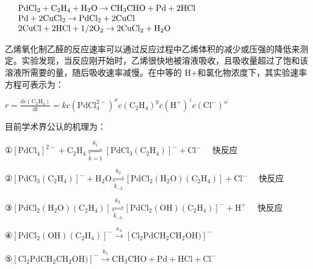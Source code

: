$
\begin{array}{r l}&\mathrm {PdCl_ {2}} + \mathrm {C_ {2} H_ {4}} + \mathrm {H_ {2} O} \rightarrow \mathrm {CH_ {3} CHO} + \mathrm{Pd} + 2 \mathrm{HCl}\\&\mathrm {Pd + 2CuCl_ {2}} \rightarrow \mathrm {PdCl_ {2}} + 2 \mathrm{CuCl}\\&2 \mathrm{CuCl} + 2 \mathrm{HCl} + 1 / 2 \mathrm {O_ {2}} \rightarrow 2 \mathrm {CuCl_ {2}} + \mathrm {H_ {2} O}\end{array}
$

⼄烯氧化制⼄醛的反应速率可以通过反应过程中⼄烯体积的减少或压强的降低来测定。实验发现，当反应刚开始时，⼄烯很快地被溶液吸收，且吸收量超过了饱和该溶液所需要的量，随后吸收速率减慢。在中等的 H+和氯化物浓度下，其实验速率⽅程可表⽰为：

$
r = \frac {\mathrm{d} c (\mathrm{C} _ {2} \mathrm{H} _ {4})}{\mathrm{d} t} = k c (\mathrm{PdCl} _ {4} ^ {2 -}) ^ {x} c (\mathrm{C} _ {2} \mathrm{H} _ {4}) ^ {y} c (\mathrm{H} ^ {+}) ^ {z} c (\mathrm{Cl} ^ {-}) ^ {\omega}
$

⽬前学术界公认的机理为：

$
① \left[ \mathrm{PdCl} _ {4} \right] ^ {2 -} + \mathrm{C} _ {2} \mathrm{H} _ {4} \underset {k = 1} {\overset {k _ {1}} {\rightleftharpoons}} \left[ \mathrm{PdCl} _ {3} (\mathrm{C} _ {2} \mathrm{H} _ {4}) \right] ^ {-} + \mathrm{Cl} ^ {-} \quad \text { 快反应 }
$

$
② \left[ \mathrm{PdCl} _ {3} (\mathrm{C} _ {2} \mathrm{H} _ {4}) \right] ^ {-} + \mathrm{H} _ {2} \mathrm{O} \underset {k _ {- 2}} {\overset {k _ {2}} {\rightleftharpoons}} \left[ \mathrm{PdCl} _ {2} (\mathrm{H} _ {2} \mathrm{O}) (\mathrm{C} _ {2} \mathrm{H} _ {4}) \right] + \mathrm{Cl} ^ {-} \quad \text { 快反应 }
$

$
③ \left[ \mathrm{PdCl} _ {2} (\mathrm{H} _ {2} \mathrm{O}) (\mathrm{C} _ {2} \mathrm{H} _ {4}) \right] \underset {k _ {- 3}} {\overset {k _ {3}} {\rightleftharpoons}} \left[ \mathrm{PdCl} _ {2} (\mathrm{OH}) (\mathrm{C} _ {2} \mathrm{H} _ {4}) \right] ^ {-} + \mathrm{H} ^ {+} \quad \text { 快反应 }
$

$
④ [ \mathrm{PdCl} _ {2} (\mathrm{OH}) (\mathrm{C} _ {2} \mathrm{H} _ {4}) ] ^ {-} \xrightarrow {\kappa_ {4}} [ \mathrm{Cl} _ {2} \mathrm{PdCH} _ {2} \mathrm{CH} _ {2} \mathrm{OH}) ] ^ {-}
$

$
⑤ \left[ \mathrm{Cl} _ {2} \mathrm{PdCH} _ {2} \mathrm{CH} _ {2} \mathrm{OH}) \right] ^ {-} \xrightarrow {k _ {5}} \mathrm{CH} _ {3} \mathrm{CHO} + \mathrm{Pd} + \mathrm{HCl} + \mathrm{Cl} ^ {-}
$

